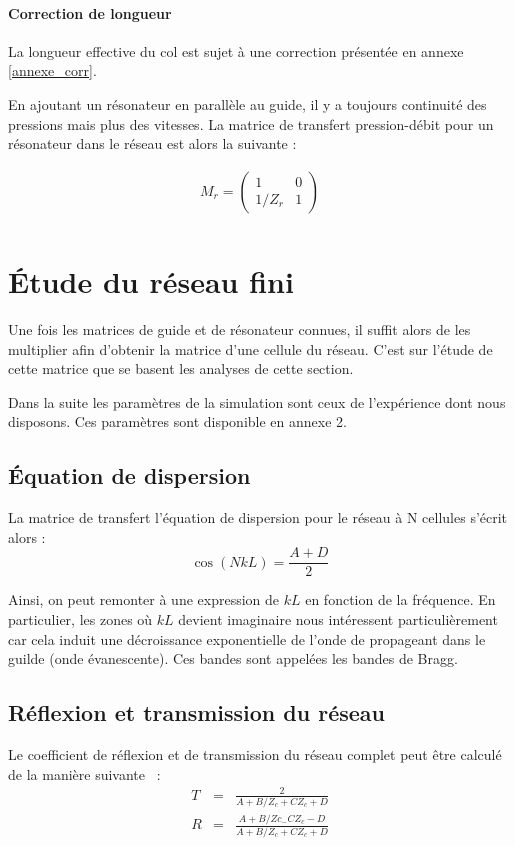 \paragraph{Correction de longueur}
La longueur effective du col est sujet à une correction présentée en annexe \ref{annexe_corr}.

En ajoutant un résonateur en parallèle au guide, il y a toujours continuité des pressions mais plus des vitesses. La matrice de transfert pression-débit pour un résonateur dans le réseau est alors la suivante :

\begin{eqnarray*}
M_{r} = \begin{pmatrix} 1 &  0 \\ 1 /Z_{r} & 1  \end{pmatrix}\\
\end{eqnarray*}

\section{Étude du réseau fini}

Une fois les matrices de guide et de résonateur connues, il suffit alors de les multiplier afin d'obtenir la matrice d'une cellule du réseau. C'est sur l'étude de cette matrice que se basent les analyses de cette section. 

Dans la suite les paramètres de la simulation sont ceux de l'expérience dont nous disposons. Ces paramètres sont disponible en annexe 2.

\subsection{Équation de dispersion}
La matrice de transfert l'équation de dispersion pour le réseau à N cellules s'écrit alors : 
\begin{equation}
\cos(NkL) = \frac{A+D}{2} 
\end{equation}

Ainsi, on peut remonter à une expression de $kL$ en fonction de la fréquence. En particulier, les zones où $kL$ devient imaginaire nous intéressent particulièrement car cela induit une décroissance exponentielle de l'onde de propageant dans le guilde (onde évanescente). Ces bandes sont appelées les bandes de Bragg.

\subsection{Réflexion et transmission du réseau}
Le coefficient de réflexion et de transmission du réseau complet peut être calculé de la manière suivante ~\cite{guide_dalmont}: 
\begin{eqnarray}
T & = & \frac{2}{A + B/Z_c + C Z_c + D} \\
R & = & \frac{A + B / Zc_ - C Z_c -D}{A + B/Z_c + C Z_c + D} 
\end{eqnarray}

